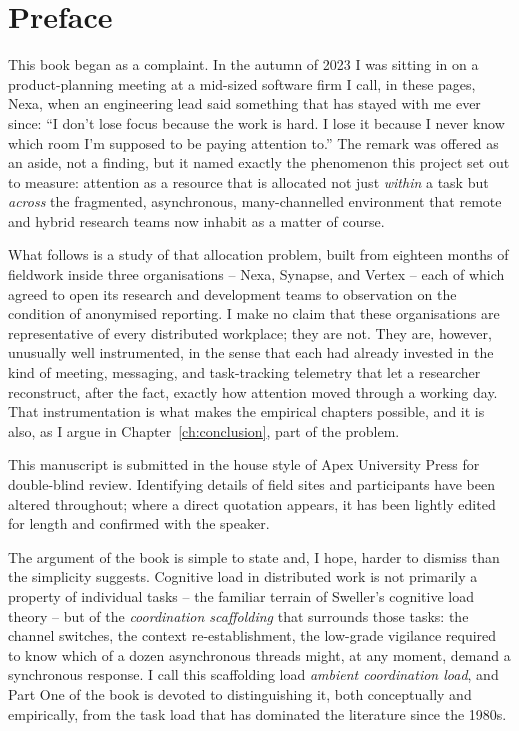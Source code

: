 \chapter*{Preface}

This book began as a complaint. In the autumn of 2023 I was sitting in on a
product-planning meeting at a mid-sized software firm I call, in these pages,
Nexa, when an engineering lead said something that has stayed
with me ever since: ``I don't lose focus because the work is hard. I lose it
because I never know which room I'm supposed to be paying attention to.''
The remark was offered as an aside, not a finding, but it named exactly the
phenomenon this project set out to measure: attention as a resource that is
allocated not just \emph{within} a task but \emph{across} the fragmented,
asynchronous, many-channelled environment that remote and hybrid research
teams now inhabit as a matter of course.

What follows is a study of that allocation problem, built from eighteen
months of fieldwork inside three organisations --
Nexa, Synapse, and Vertex -- each of
which agreed to open its research and development teams to observation on
the condition of anonymised reporting. I make no claim that these
organisations are representative of every distributed workplace; they are
not. They are, however, unusually well instrumented, in the sense that each
had already invested in the kind of meeting, messaging, and task-tracking
telemetry that let a researcher reconstruct, after the fact, exactly how
attention moved through a working day. That instrumentation is what makes
the empirical chapters possible, and it is also, as I argue in
Chapter~\ref{ch:conclusion}, part of the problem.

\begin{editorialnote}
This manuscript is submitted in the house style of Apex University Press for
double-blind review. Identifying details of field sites and participants
have been altered throughout; where a direct quotation appears, it has been
lightly edited for length and confirmed with the speaker.
\end{editorialnote}

The argument of the book is simple to state and, I hope, harder to dismiss
than the simplicity suggests. Cognitive load in
distributed work is not primarily a property of individual tasks -- the
familiar terrain of Sweller's cognitive load theory -- but of the
\emph{coordination scaffolding} that surrounds those tasks: the channel
switches, the context re-establishment, the low-grade vigilance required to
know which of a dozen asynchronous threads might, at any moment, demand a
synchronous response. I call this scaffolding load
\emph{ambient coordination load}, and Part
One of the book is devoted to distinguishing it, both conceptually and
empirically, from the task load that has dominated the literature since the
1980s.

